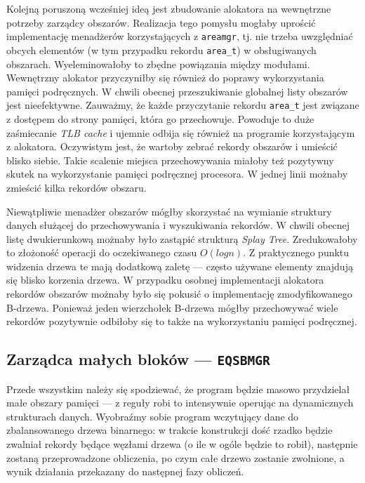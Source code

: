 \documentclass[12pt,a4paper,titlepage,twoside]{mwart}
\begin{document}
Kolejną poruszoną wcześniej ideą jest zbudowanie alokatora na wewnętrzne
potrzeby zarządcy obszarów. Realizacja tego pomysłu mogłaby uprościć
implementację menadżerów korzystających z \texttt{areamgr}, tj. nie trzeba
uwzględniać obcych elementów (w tym przypadku rekordu \texttt{area\_t}) w
obsługiwanych obszarach. Wyeleminowałoby to zbędne powiązania między modułami.
Wewnętrzny alokator przyczyniłby się również do poprawy wykorzystania pamięci
podręcznych. W chwili obecnej przeszukiwanie globalnej listy obszarów jest
nieefektywne. Zauważmy, że każde przyczytanie rekordu \texttt{area\_t} jest
związane z dostępem do strony pamięci, która go przechowuje. Powoduje to duże
zaśmiecanie \textit{TLB cache} i ujemnie odbija się również na programie
korzystającym z alokatora. Oczywistym jest, że wartoby zebrać rekordy obszarów
i umieścić blisko siebie. Takie scalenie miejsca przechowywania miałoby też
pozytywny skutek na wykorzystanie pamięci podręcznej procesora. W jednej linii
możnaby zmieścić kilka rekordów obszaru.

Niewątpliwie menadżer obszarów mógłby skorzystać na wymianie struktury danych
służącej do przechowywania i wyszukiwania rekordów. W chwili obecnej listę
dwukierunkową możnaby było zastąpić strukturą \textit{Splay Tree}.
Zredukowałoby to złożoność operacji do oczekiwanego czasu $O(log n)$. Z
praktycznego punktu widzenia drzewa te mają dodatkową zaletę --- często używane
elementy znajdują się blisko korzenia drzewa. W przypadku osobnej implementacji
alokatora rekordów obszarów możnaby było się pokusić o implementację
zmodyfikowanego B-drzewa.  Ponieważ jeden wierzchołek B-drzewa mógłby
przechowywać wiele rekordów pozytywnie odbiłoby się to także na wykorzystaniu
pamięci podręcznej.

\newpage

\subsection{Zarządca małych bloków --- \texttt{EQSBMGR}}

Przede wszystkim należy się spodziewać, że program będzie masowo przydzielał
małe obszary pamięci --- z reguły robi to intensywnie operując na dynamicznych
strukturach danych. Wyobraźmy sobie program wczytujący dane do zbalansowanego
drzewa binarnego: w trakcie konstrukcji dość rzadko będzie zwalniał rekordy
będące węzłami drzewa (o ile w ogóle będzie to robił), następnie zostaną
przeprowadzone obliczenia, po czym całe drzewo zostanie zwolnione, a wynik
działania przekazany do następnej fazy obliczeń.
\end{document}
